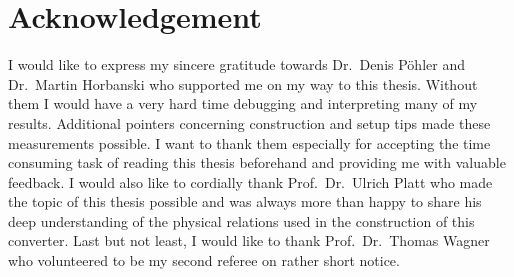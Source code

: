 \section{Acknowledgement}
\label{sec:acknowledgement}

I would like to express my sincere gratitude towards Dr.\ Denis Pöhler
and Dr.\ Martin Horbanski who supported me on my way to this
thesis. Without them I would have a very hard time debugging and
interpreting many of my results. Additional pointers concerning
construction and setup tips made these measurements possible.  I want
to thank them especially for accepting the time consuming task of
reading this thesis beforehand and providing me with valuable
feedback. I would also like to cordially thank Prof.\ Dr.\ Ulrich
Platt who made the topic of this thesis possible and was always more
than happy to share his deep understanding of the physical relations
used in the construction of this converter. Last but not least, I
would like to thank Prof.\ Dr.\ Thomas Wagner who volunteered to be my
second referee on rather short notice.

